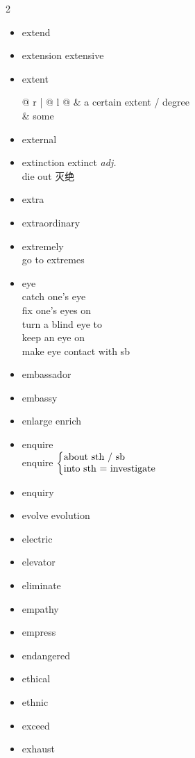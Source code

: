\documentclass[../../book.tex]{subfiles}
\begin{document}
\begin{multicols}{2}
\begin{itemize}
\item[-] extend
\item[-] extension \phantom{a} extensive
\item[-] extent
\\\begin{tabular}{@{} r | @{\hspace{0.1em}} l @{}}
 & a certain extent / degree
\\& some
\end{tabular}
\item[-] external
\item[-] extinction \phantom{a} extinct \emph{adj.}
\\die out 灭绝
\item[-] extra
\item[-] extraordinary
\item[-] extremely
\\go to extremes
\item[-] eye
\\catch one\textquoteright s eye
\\fix one\textquoteright s eyes on
\\turn a blind eye to
\\keep an eye on
\\make eye contact with sb
\item[-] embassador
\item[-] embassy
\item[-] enlarge \phantom{a} {\color{violet}enrich}
\item[-] enquire
\\enquire $\left\{
\begin{array}{@{}l@{}}
\text{about sth / sb} \\
\text{into sth = investigate}
\end{array}
\right.$
\item[-] enquiry
\item[-] evolve \phantom{a} evolution
\item[-] electric
\item[-] elevator
\item[-] eliminate
\item[-] empathy
\item[-] empress
\item[-] endangered
\item[-] ethical
\item[-] ethnic
\item[-] exceed
\item[-] exhaust
\end{itemize}
\end{multicols}
\end{document}
